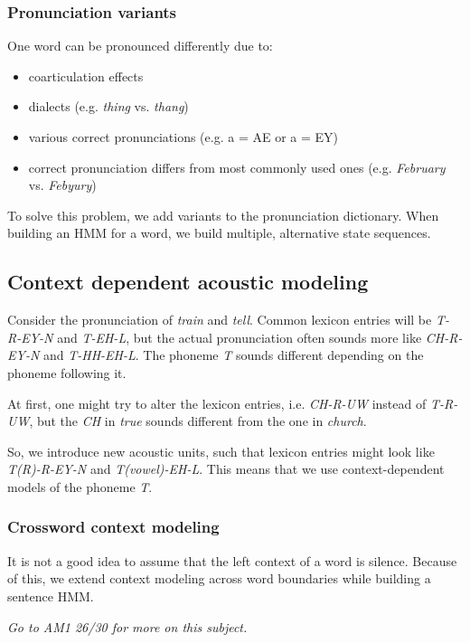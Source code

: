 \documentclass[11pt]{article}
\begin{document}
\subsubsection{Pronunciation variants}

One word can be pronounced differently due to:
\begin{itemize}
    \item coarticulation effects
    \item dialects (e.g. \textit{thing} vs. \textit{thang})
    \item various correct pronunciations (e.g. a = AE or a = EY)
    \item correct pronunciation differs from most commonly used ones (e.g. \textit{February} vs. \textit{Febyury})
\end{itemize}
To solve this problem, we add variants to the pronunciation dictionary. When building an HMM for a word, we build multiple, alternative state sequences.

\subsection{Context dependent acoustic modeling}

Consider the pronunciation of \textit{train} and \textit{tell}. Common lexicon entries will be \textit{T-R-EY-N} and \textit{T-EH-L}, but the actual pronunciation often sounds more like \textit{CH-R-EY-N} and \textit{T-HH-EH-L}. The phoneme \textit{T} sounds different depending on the phoneme following it.

At first, one might try to alter the lexicon entries, i.e. \textit{CH-R-UW} instead of \textit{T-R-UW}, but the \textit{CH} in \textit{true} sounds different from the one in \textit{church}.

So, we introduce new acoustic units, such that lexicon entries might look like \textit{T(R)-R-EY-N} and \textit{T(vowel)-EH-L}. This means that we use context-dependent models of the phoneme \textit{T}.

\subsubsection{Crossword context modeling}

It is not a good idea to assume that the left context of a word is silence. Because of this, we extend context modeling across word boundaries while building a sentence HMM.

\textit{Go to AM1 26/30 for more on this subject.}
\end{document}
